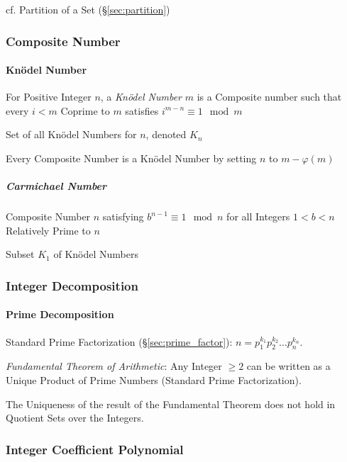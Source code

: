 cf. Partition of a Set (\S\ref{sec:partition})



\subsubsection{Composite Number}\label{sec:composite_number}

\paragraph{Kn\"odel Number}\label{sec:knodel_number}\hfill

For Positive Integer $n$, a \emph{Kn\"odel Number} $m$ is a Composite
number such that every $i < m$ Coprime to $m$ satisfies $i^{m-n}
\equiv 1 \mod m$

Set of all Kn\"odel Numbers for $n$, denoted $K_n$

Every Composite Number is a Kn\"odel Number by setting $n$ to $m -
\varphi(m)$



\subparagraph{Carmichael Number}\label{sec:carmichael_number}\hfill

Composite Number $n$ satisfying $b^{n-1} \equiv 1 \mod n$ for all
Integers $1 < b < n$ Relatively Prime to $n$

Subset $K_1$ of Kn\"odel Numbers



\subsubsection{Integer Decomposition}\label{sec:integer_decomposition}

\paragraph{Prime Decomposition}\label{sec:prime_decomposition}\hfill

Standard Prime Factorization (\S\ref{sec:prime_factor}): $n =
p_1^{k_1} p_2^{k_2} \ldots p_n^{k_n}$.

\emph{Fundamental Theorem of Arithmetic}: Any Integer $\geq 2$ can be
written as a Unique Product of Prime Numbers (Standard Prime
Factorization).

The Uniqueness of the result of the Fundamental Theorem does not hold
in Quotient Sets over the Integers.



\subsubsection{Integer Coefficient Polynomial}
\label{sec:integer_coefficient}

